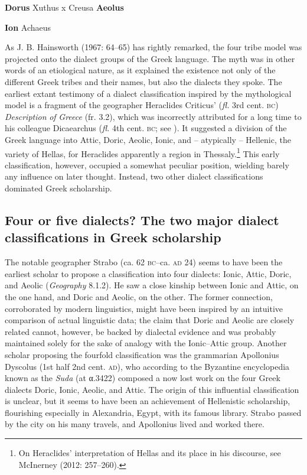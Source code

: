 \documentclass[output=paper]{langsci/langscibook}
\begin{document}
\textbf{Dorus}  Xuthus x Creusa  \textbf{Aeolus}

\textbf{Ion}  Achaeus

As J. B. Hainsworth (1967: 64–65) has rightly remarked, the four tribe model was projected onto the dialect groups of the Greek language. The myth was in other words of an etiological nature, as it explained the existence not only of the different Greek tribes and their names, but also the dialects they spoke. The earliest extant testimony of a dialect classification inspired by the mythological model is a fragment of the geographer Heraclides Criticus’ (\textit{fl.} 3rd cent. \textsc{bc}) \textit{Description} \textit{of} \textit{Greece} (fr. 3.2), which was incorrectly attributed for a long time to his colleague Dicaearchus (\textit{fl.} 4th cent. \textsc{bc}; see \citealt{Brodersen2015}). It suggested a division of the Greek language into Attic, Doric, Aeolic, Ionic, and – atypically – Hellenic, the variety of Hellas, for Heraclides apparently a region in Thessaly.\footnote{On Heraclides’ interpretation of Hellas and its place in his discourse, see McInerney (2012: 257–260).} This early classification, however, occupied a somewhat peculiar position, wielding barely any influence on later thought. Instead, two other dialect classifications dominated Greek scholarship.

\subsection{Four or five dialects? The two major dialect classifications in Greek scholarship}
\hypertarget{Toc19704808}{}
The notable geographer Strabo (ca. 62 \textsc{bc–}ca. \textsc{ad} 24) seems to have been the earliest scholar to propose a classification into four dialects: Ionic, Attic, Doric, and Aeolic (\textit{Geography} 8.1.2). He saw a close kinship between Ionic and Attic, on the one hand, and Doric and Aeolic, on the other. The former connection, corroborated by modern linguistics, might have been inspired by an intuitive comparison of actual linguistic data; the claim that Doric and Aeolic are closely related cannot, however, be backed by dialectal evidence and was probably maintained solely for the sake of analogy with the Ionic–Attic group. Another scholar proposing the fourfold classification was the grammarian Apollonius Dyscolus (1st half 2nd cent. \textsc{ad}), who according to the Byzantine encyclopedia known as the \textit{Suda} (at α.3422) composed a now lost work on the four Greek dialects Doric, Ionic, Aeolic, and Attic. The origin of this influential classification is unclear, but it seems to have been an achievement of Hellenistic scholarship, flourishing especially in Alexandria, Egypt, with its famous library. Strabo passed by the city on his many travels, and Apollonius lived and worked there.
\end{document}
